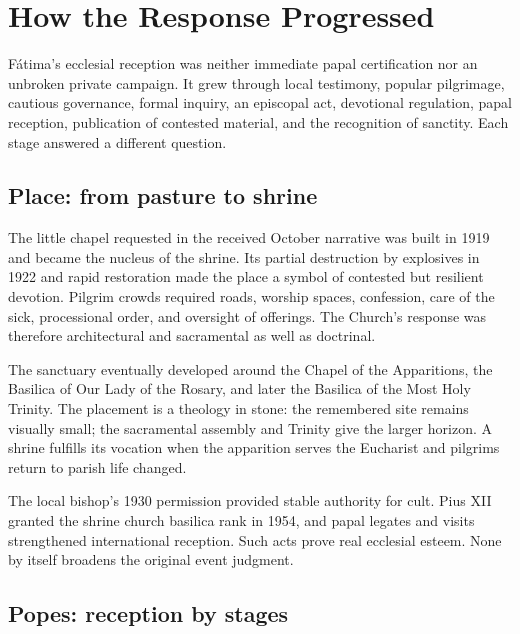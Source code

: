\section{How the Response Progressed}

Fátima's ecclesial reception was neither immediate papal certification nor an unbroken private campaign. It grew through local testimony, popular pilgrimage, cautious governance, formal inquiry, an episcopal act, devotional regulation, papal reception, publication of contested material, and the recognition of sanctity. Each stage answered a different question.

\subsection{Place: from pasture to shrine}

The little chapel requested in the received October narrative was built in 1919 and became the nucleus of the shrine. Its partial destruction by explosives in 1922 and rapid restoration made the place a symbol of contested but resilient devotion. Pilgrim crowds required roads, worship spaces, confession, care of the sick, processional order, and oversight of offerings. The Church's response was therefore architectural and sacramental as well as doctrinal.

The sanctuary eventually developed around the Chapel of the Apparitions, the Basilica of Our Lady of the Rosary, and later the Basilica of the Most Holy Trinity. The placement is a theology in stone: the remembered site remains visually small; the sacramental assembly and Trinity give the larger horizon. A shrine fulfills its vocation when the apparition serves the Eucharist and pilgrims return to parish life changed.

The local bishop's 1930 permission provided stable authority for cult. Pius XII granted the shrine church basilica rank in 1954, and papal legates and visits strengthened international reception. Such acts prove real ecclesial esteem. None by itself broadens the original event judgment.

\subsection{Popes: reception by stages}

